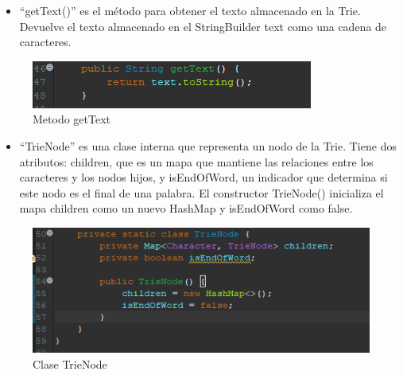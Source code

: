 \documentclass{article}
\begin{document}
   \clearpage
   \begin{itemize}
       \item “getText()” es el método para obtener el texto almacenado en la Trie. Devuelve el texto almacenado en el StringBuilder text como una cadena de caracteres.
   \end{itemize}
   \begin{figure}[H]
       \centering
       \includegraphics{img/img13.png}
       \caption{Metodo getText}
       \label{fig:enter-label}
   \end{figure}
   \begin{itemize}
       \item “TrieNode” es una clase interna que representa un nodo de la Trie. Tiene dos atributos: children, que es un mapa que mantiene las relaciones entre los caracteres y los nodos hijos, y isEndOfWord, un indicador que determina si este nodo es el final de una palabra. El constructor TrieNode() inicializa el mapa children como un nuevo HashMap y isEndOfWord como false.
   \end{itemize}
   \begin{figure}[H]
       \centering
       \includegraphics{img/img14.png}
       \caption{Clase TrieNode}
       \label{fig:enter-label}
   \end{figure}
   
   \clearpage
\end{document}
